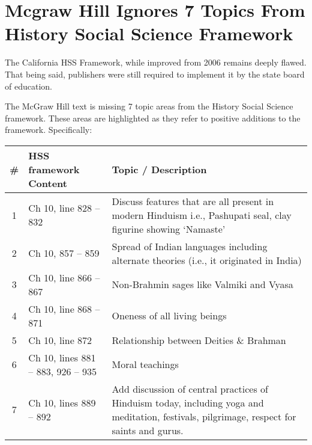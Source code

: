 \chapter{Mcgraw Hill Ignores 7 Topics From History Social Science Framework}

The California HSS Framework, while improved from 2006 remains deeply flawed. That being said, publishers were still required to implement it by the state board of education.

The McGraw Hill text is missing 7 topic areas from the History Social Science framework. These areas are highlighted as they refer to positive additions to the framework. Specifically:

\begin{longtable}{|c|p{3.5cm}|p{5.5cm}|}
\hline 
\# & HSS framework Content & Topic / Description\tabularnewline
\hline
1 & Ch 10, line 828 – 832 &  Discuss features that are all present in modern Hinduism i.e., Pashupati seal, clay figurine showing ‘Namaste’\tabularnewline
\hline
2 & Ch 10, 857 – 859 & Spread of Indian languages including alternate theories (i.e., it originated in India)\tabularnewline 
\hline
3 & Ch 10, line 866 – 867 & Non-Brahmin sages like Valmiki and Vyasa\tabularnewline
\hline
4 & Ch 10, line 868 – 871 & Oneness of all living beings\tabularnewline
\hline
5 & Ch 10, line 872 & Relationship between Deities \& Brahman\tabularnewline
\hline
6 & Ch 10, lines 881 – 883, 926 – 935 & Moral teachings\tabularnewline
\hline
7 & Ch 10, lines 889 – 892 & Add discussion of central practices of Hinduism today, including yoga and meditation, festivals, pilgrimage, respect for saints 
and gurus.\tabularnewline
\hline
\end{longtable}

